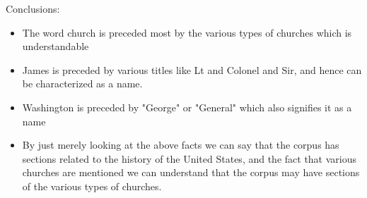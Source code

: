 \documentclass[12pt,letterpaper]{article}
\begin{document}
Conclusions:
\begin{itemize}
\item The word church is preceded most by the various types of churches which is understandable
\item James is preceded by various titles like Lt and Colonel and Sir, and hence can be characterized as a name.
\item Washington is preceded by "George" or "General" which also signifies it as a name
\item By just merely looking at the above facts we can say that the corpus has sections related to the history of the United States, and the fact that various churches are mentioned we can understand that the corpus may have sections of the various types of churches.
\end{itemize}
\end{document}
